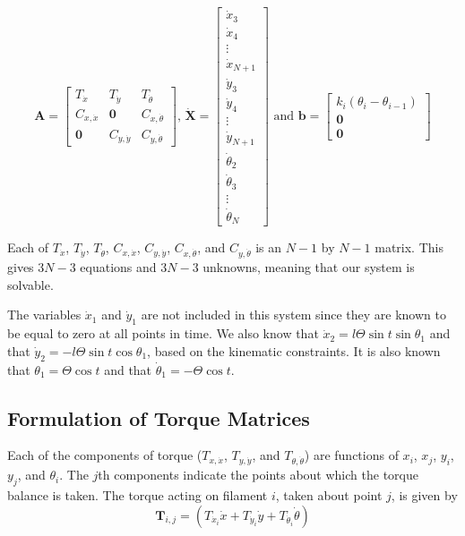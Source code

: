 \documentclass[12pt,letterpaper,titlepage]{article}
\begin{document}
\[\mathbf{A} = \begin{bmatrix}
T_{\dot{x}}&T_{\dot{y}}&T_{\dot{\theta}}\\
C_{x,\dot{x}}&\mathbf{0}&C_{x,\dot{\theta}}\\
\mathbf{0}&C_{y,\dot{y}}&C_{y,\dot{\theta}}
\end{bmatrix}
\text{, }
\mathbf{\dot{X}} = \begin{bmatrix}
\dot{x}_3\\
\dot{x}_4\\
\vdots \\
\dot{x}_{N+1}\\
\dot{y}_3\\
\dot{y}_4\\
\vdots \\
\dot{y}_{N+1}\\
\dot{\theta}_2\\
\dot{\theta}_3\\
\vdots \\
\dot{\theta}_N
\end{bmatrix}
\text{ and }
\mathbf{b} = \begin{bmatrix}
k_i (\theta_i - \theta_{i-1})\\
\mathbf{0}\\
\mathbf{0}
\end{bmatrix}
\]

Each of $T_{\dot{x}}$, $T_{\dot{y}}$, $T_{\dot{\theta}}$, $C_{x,\dot{x}}$, $C_{y,\dot{y}}$, $C_{x,\dot{\theta}}$, and $C_{y,\dot{\theta}}$ is an $N-1$ by $N-1$ matrix. This gives $3N-3$ equations and $3N-3$ unknowns, meaning that our system is solvable.

The variables $\dot{x}_1$ and $\dot{y}_1$ are not included in this system since they are known to be equal to zero at all points in time. We also know that $\dot{x}_2 = l \Theta \sin t \sin \theta_1$ and that $\dot{y}_2 = - l \Theta \sin t \cos \theta_1$, based on the kinematic constraints. It is also known that $\theta_1 = \Theta \cos t$ and that $\dot{\theta}_1 = - \Theta \cos t$.
\newpage
\subsection{Formulation of Torque Matrices}
Each of the components of torque ($T_{x,\dot{x}}$, $T_{y,\dot{y}}$, and $T_{\theta,\dot{\theta}}$) are functions of $x_i$, $x_j$, $y_i$, $y_j$, and $\theta_i$. The $j$th components indicate the points about which the torque balance is taken. The torque acting on filament $i$, taken about point $j$, is given by
\begin{equation}
\mathbf{T}_{i,j} = (T_{\dot{x}_i}\dot{x}+T_{\dot{y}_i}\dot{y}+T_{\dot{\theta}_i}\dot{\theta})
\end{equation}
\end{document}
